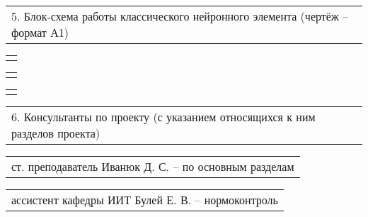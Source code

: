 \documentclass[12pt, А4, twoside]{article}
\begin{document}
\begin{FlushLeft}
		\vspace{-0.1 cm}
		
		\begin{tabular}{p{17.25cm}}
			\hspace{0.3cm} \textsf{5. Блок-схема работы классического нейронного элемента (чертёж {--} формат А1)} \vspace{0pt} \hline  \\
		\end{tabular}
		
		\begin{tabular}{p{17.25cm}}
			\vspace{0pt} \hline  \\
		\end{tabular}
		
		\begin{tabular}{p{17.25cm}}
			\vspace{0pt} \hline  \\
		\end{tabular}
		
		\begin{tabular}{p{17.25cm}}
			\vspace{0pt} \hline \\
		\end{tabular}
		
		\begin{tabular}{p{17.25cm}}
			\textsf{6. Консультанты по проекту (с указанием относящихся к ним разделов проекта)} \vspace{0pt} \hline \\
		\end{tabular}
		
		\vspace{-0.1 cm}
		
		\begin{tabular}{p{17.25cm}}
			\hspace{0.3cm} \textsf{ст. преподаватель Иванюк Д. С.} \hspace{4.065cm} \textsf{{--} по основным разделам} \vspace{0pt} \hline \\
		\end{tabular}
		
		\vspace{-0.1 cm}
		
		\begin{tabular}{p{17.25cm}}
			\hspace{0.3cm} \textsf{ассистент кафедры ИИТ Булей Е. В.} \hspace{3.3325cm} \textsf{{--} нормоконтроль} \vspace{0pt} \hline \\
		\end{tabular}
		

\end{FlushLeft}
\end{document}
